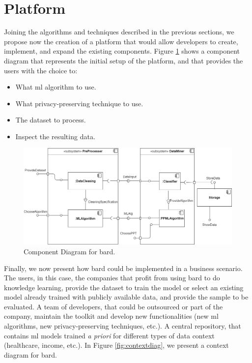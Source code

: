
\section{Platform}
\label{sec:components}

Joining the algorithms and techniques described in the previous sections, we propose now the creation of a platform that would allow developers to create, implement, and expand the existing components. Figure \ref{fig:compdiag} shows a component diagram that represents the initial setup of the platform, and that provides the users with the choice to:

\begin{itemize}
	\item What \ac{ml} algorithm to use.
	\item What privacy-preserving technique to use.
	\item The dataset to process.
	\item Inspect the resulting data.
\end{itemize}

\begin{figure}[ht]
  \centerline{\includegraphics[width=1.1\textwidth]{images/CompDiagram.png}}
  \caption{Component Diagram for \acs{bard}.}
  \label{fig:compdiag}
\end{figure} 


Finally, we now present how \acs{bard} could be implemented in a business scenario. The users, in this case, the companies that profit from using \acs{bard} to do knowledge learning, provide the dataset to train the model or select an existing model already trained with publicly available data, and provide the sample to be evaluated. A team of developers, that could be outsourced or part of the company, maintain the toolkit and develop new functionalities (new \ac{ml} algorithms, new privacy-preserving techniques, etc.). A central repository, that contains \ac{ml} models trained \textit{a priori} for different types of data context (healthcare, income, etc.). In Figure \ref{fig:contextdiag}, we present a context diagram for \acs{bard}. 


